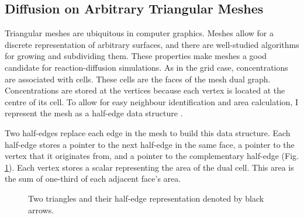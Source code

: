 \begin{figure}[H]
\centering
{}
\end{figure}

\subsection{Diffusion on Arbitrary Triangular Meshes}
Triangular meshes are ubiquitous in computer graphics. Meshes allow for a discrete representation of arbitrary surfaces, and there are well-studied algorithms for growing and subdividing them. These properties make meshes a good candidate for reaction-diffusion simulations. As in the grid case, concentrations are associated with cells. These cells are the faces of the mesh dual graph. Concentrations are stored at the vertices because each vertex is located at the centre of its cell. To allow for easy neighbour identification and area calculation, I represent the mesh as a half-edge data structure \citep{marschner2015}.

Two half-edges replace each edge in the mesh to build this data structure. Each half-edge stores a pointer to the next half-edge in the same face, a pointer to the vertex that it originates from, and a pointer to the complementary half-edge (Fig. \ref{fig:halfEdgeMesh}). Each vertex stores a scalar representing the area of the dual cell. This area is the sum of one-third of each adjacent face's area. %

\begin{figure}[H]
    \centering
    \caption[Two triangles and their half-edge representation denoted by black arrows]{Two triangles and their half-edge representation denoted by black arrows.}
    \label{fig:halfEdgeMesh}
\end{figure}

